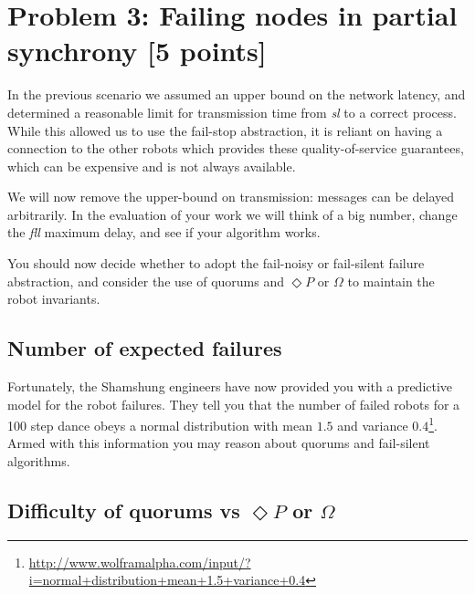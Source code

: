 \documentclass[a4paper]{article}
\begin{document}













\section*{Problem 3: Failing nodes in partial synchrony [5 points]} %
\label{sec:problem_3_partial_synchrony}

In the previous scenario we assumed an upper bound on the network latency, and
determined a reasonable limit for transmission time from \emph{sl} to a
correct process. While this allowed us to use the fail-stop abstraction, it is
reliant on having a connection to the other robots which provides these
quality-of-service guarantees, which can be expensive and is not always
available.

We will now remove the upper-bound on transmission: messages can be delayed
arbitrarily. In the evaluation of your work we will think of a big number,
change the \emph{fll} maximum delay, and see if your algorithm works.

You should now decide whether to adopt the fail-noisy or fail-silent failure
abstraction, and consider the use of quorums and $\Diamond P$ or $\Omega$ to
maintain the robot invariants.

\subsection*{Number of expected failures} %
\label{sub:number_of_expected_failures}

Fortunately, the Shamshung engineers have now provided you with a predictive
model for the robot failures. They tell you that the number of failed robots
for a 100 step dance obeys a normal distribution with mean $1.5$ and variance
$0.4$\footnote{\url{http://www.wolframalpha.com/input/?i=normal+distribution+mean+1.5+variance+0.4}}.
Armed with this information you may reason about quorums and fail-silent
algorithms.



\subsection*{Difficulty of quorums vs $\Diamond P$ or $\Omega$} %
\label{sub:difficulty_of_quorums_vs_diamond_p_}
\end{document}
